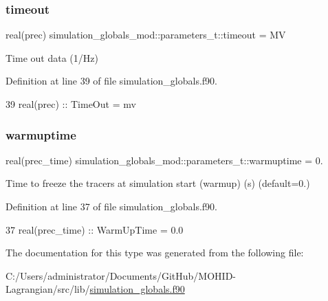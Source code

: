 \subsubsection{\texorpdfstring{timeout}{timeout}}
{\footnotesize\ttfamily real(prec) simulation\+\_\+globals\+\_\+mod\+::parameters\+\_\+t\+::timeout = MV\hspace{0.3cm}{\ttfamily [private]}}



Time out data (1/\+Hz) 



Definition at line 39 of file simulation\+\_\+globals.\+f90.


\begin{DoxyCode}
39         \textcolor{keywordtype}{real(prec)} :: TimeOut = mv              
\end{DoxyCode}
\mbox{\label{structsimulation__globals__mod_1_1parameters__t_aff3f4d5714c5a91daaad20aacf63f0a5}} 
\subsubsection{\texorpdfstring{warmuptime}{warmuptime}}
{\footnotesize\ttfamily real(prec\+\_\+time) simulation\+\_\+globals\+\_\+mod\+::parameters\+\_\+t\+::warmuptime = 0.\hspace{0.3cm}{\ttfamily [private]}}



Time to freeze the tracers at simulation start (warmup) (s) (default=0.) 



Definition at line 37 of file simulation\+\_\+globals.\+f90.


\begin{DoxyCode}
37         \textcolor{keywordtype}{real(prec\_time)} :: WarmUpTime = 0.0
\end{DoxyCode}


The documentation for this type was generated from the following file\+:\begin{DoxyCompactItemize}
\item 
C\+:/\+Users/administrator/\+Documents/\+Git\+Hub/\+M\+O\+H\+I\+D-\/\+Lagrangian/src/lib/\mbox{\hyperlink{simulation__globals_8f90}{simulation\+\_\+globals.\+f90}}\end{DoxyCompactItemize}
